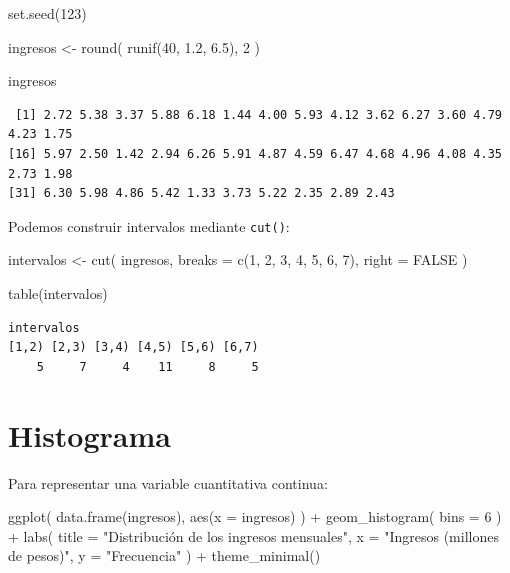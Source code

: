 \documentclass[
  spanish,
  14pt,
  letterpaper,
  DIV=11,
  numbers=noendperiod]{scrartcl}
\newenvironment{Shaded}{\begin{snugshade}}{\end{snugshade}}
\newcommand{\AttributeTok}[1]{\textcolor[rgb]{0.98,0.15,0.45}{#1}}
\newcommand{\ConstantTok}[1]{\textcolor[rgb]{0.68,0.51,1.00}{#1}}
\newcommand{\DecValTok}[1]{\textcolor[rgb]{0.68,0.51,1.00}{#1}}
\newcommand{\FloatTok}[1]{\textcolor[rgb]{0.68,0.51,1.00}{#1}}
\newcommand{\FunctionTok}[1]{\textcolor[rgb]{0.65,0.89,0.18}{#1}}
\newcommand{\NormalTok}[1]{\textcolor[rgb]{0.97,0.97,0.95}{#1}}
\newcommand{\OtherTok}[1]{\textcolor[rgb]{0.65,0.89,0.18}{#1}}
\newcommand{\SpecialCharTok}[1]{\textcolor[rgb]{0.68,0.51,1.00}{#1}}
\newcommand{\StringTok}[1]{\textcolor[rgb]{0.90,0.86,0.45}{#1}}
\begin{document}
\begin{Shaded}
\begin{Highlighting}[]
\FunctionTok{set.seed}\NormalTok{(}\DecValTok{123}\NormalTok{)}

\NormalTok{ingresos }\OtherTok{\textless{}{-}} \FunctionTok{round}\NormalTok{(}
  \FunctionTok{runif}\NormalTok{(}\DecValTok{40}\NormalTok{, }\FloatTok{1.2}\NormalTok{, }\FloatTok{6.5}\NormalTok{),}
  \DecValTok{2}
\NormalTok{)}

\NormalTok{ingresos}
\end{Highlighting}
\end{Shaded}

\begin{verbatim}
 [1] 2.72 5.38 3.37 5.88 6.18 1.44 4.00 5.93 4.12 3.62 6.27 3.60 4.79 4.23 1.75
[16] 5.97 2.50 1.42 2.94 6.26 5.91 4.87 4.59 6.47 4.68 4.96 4.08 4.35 2.73 1.98
[31] 6.30 5.98 4.86 5.42 1.33 3.73 5.22 2.35 2.89 2.43
\end{verbatim}

Podemos construir intervalos mediante \texttt{cut()}:

\begin{Shaded}
\begin{Highlighting}[]
\NormalTok{intervalos }\OtherTok{\textless{}{-}} \FunctionTok{cut}\NormalTok{(}
\NormalTok{  ingresos,}
  \AttributeTok{breaks =} \FunctionTok{c}\NormalTok{(}\DecValTok{1}\NormalTok{, }\DecValTok{2}\NormalTok{, }\DecValTok{3}\NormalTok{, }\DecValTok{4}\NormalTok{, }\DecValTok{5}\NormalTok{, }\DecValTok{6}\NormalTok{, }\DecValTok{7}\NormalTok{),}
  \AttributeTok{right =} \ConstantTok{FALSE}
\NormalTok{)}

\FunctionTok{table}\NormalTok{(intervalos)}
\end{Highlighting}
\end{Shaded}

\begin{verbatim}
intervalos
[1,2) [2,3) [3,4) [4,5) [5,6) [6,7) 
    5     7     4    11     8     5 
\end{verbatim}

\section{Histograma}\label{histograma}

Para representar una variable cuantitativa continua:

\begin{Shaded}
\begin{Highlighting}[]
\FunctionTok{ggplot}\NormalTok{(}
  \FunctionTok{data.frame}\NormalTok{(ingresos),}
  \FunctionTok{aes}\NormalTok{(}\AttributeTok{x =}\NormalTok{ ingresos)}
\NormalTok{) }\SpecialCharTok{+}
  \FunctionTok{geom\_histogram}\NormalTok{(}
    \AttributeTok{bins =} \DecValTok{6}
\NormalTok{  ) }\SpecialCharTok{+}
  \FunctionTok{labs}\NormalTok{(}
    \AttributeTok{title =} \StringTok{"Distribución de los ingresos mensuales"}\NormalTok{,}
    \AttributeTok{x =} \StringTok{"Ingresos (millones de pesos)"}\NormalTok{,}
    \AttributeTok{y =} \StringTok{"Frecuencia"}
\NormalTok{  ) }\SpecialCharTok{+}
  \FunctionTok{theme\_minimal}\NormalTok{()}
\end{Highlighting}
\end{Shaded}
\end{document}
